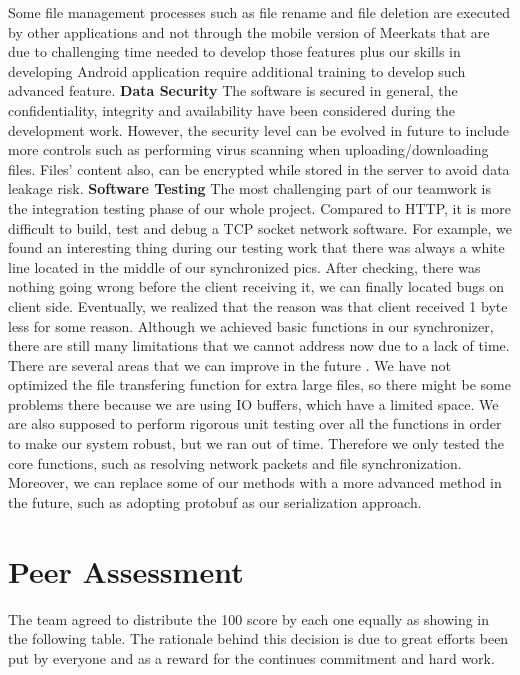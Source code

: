 \documentclass{article}
\begin{document}
Some file management processes such as file rename and file deletion are executed by other applications and not through the mobile version of Meerkats that are due to challenging time needed to develop those features plus our skills in developing Android application require additional training to develop such advanced feature.
\newline
\hfill \break
\textbf{Data Security}
The software is secured in general, the confidentiality, integrity and availability have been considered during the development work. However, the security level can be evolved in future to include more controls such as performing virus scanning when uploading/downloading files. Files’ content also, can be encrypted while stored in the server to avoid data leakage risk.
\newline
\hfill \break
\textbf{Software Testing}
The most challenging part of our teamwork is the integration testing phase of our whole project. Compared to HTTP, it is more difficult to build, test and debug a TCP socket network software. For example, we found an interesting thing during our testing work that there was always a white line located in the middle of our synchronized pics. After checking, there was nothing going wrong before the client receiving it, we can finally located bugs on client side. Eventually, we realized that the reason was that client received 1 byte less for some reason.
\newline
\hfill \break
Although we achieved basic functions in our synchronizer, there are still many limitations that we cannot address now due to a lack of time. There are several areas that we can improve in the future . We have not optimized the file transfering function for extra large files, so there might be some problems there because we are using IO buffers, which have a limited space. We are also supposed to perform rigorous unit testing over all the functions in order to make our system robust, but we ran out of time. Therefore we only tested the core functions, such as resolving network packets and file synchronization. Moreover, we can replace some of our methods with a more advanced method in the future, such as adopting protobuf as our serialization approach.


\section{Peer Assessment}
The team agreed to distribute the 100 score by each one equally as showing in the following table. The rationale behind this decision is due to great efforts been put by everyone and as a reward for the continues commitment and hard work.
\end{document}
